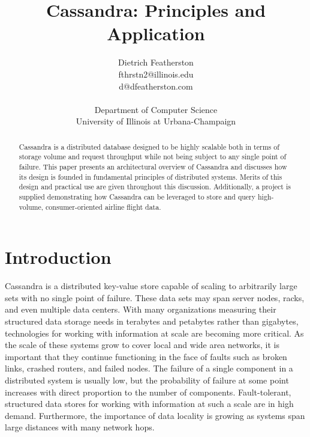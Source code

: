 \documentclass[twocolumn]{article}
\begin{document}
\title{Cassandra: Principles and Application}
\author{Dietrich Featherston\\
\small fthrstn2@illinois.edu\\
\small d@dfeatherston.com\\
\small \\
\small Department of Computer Science\\
\small University of Illinois at Urbana-Champaign
\small \\[-0.25in]} \date{}
\maketitle

\pagestyle{myheadings}
\thispagestyle{empty}

\begin{abstract}
\noindent
Cassandra is a distributed database designed to be highly scalable both in terms of storage volume and request throughput while not being subject to any single point of failure. This paper presents an architectural overview of Cassandra and discusses how its design is founded in fundamental principles of distributed systems.  Merits of this design and practical use are given throughout this discussion.   Additionally, a project is supplied demonstrating how Cassandra can be leveraged to store and query high-volume, consumer-oriented airline flight data.
\end{abstract}

\section{Introduction}\label{s:intro}

Cassandra is a distributed key-value store capable of scaling to arbitrarily large sets with no single point of failure.   These data sets may span server nodes, racks, and even multiple data centers.  With many organizations measuring their structured data storage needs in terabytes and petabytes rather than gigabytes, technologies for working with information at scale are becoming more critical. As the scale of these systems grow to cover local and wide area networks, it is important that they continue functioning in the face of faults such as broken links, crashed routers, and failed nodes.  The failure of a single component in a distributed system is usually low, but the probability of failure at some point increases with direct proportion to the number of components.  Fault-tolerant, structured data stores for working with information at such a scale are in high demand.  Furthermore, the importance of data locality is growing as systems span large distances with many network hops.
\end{document}

